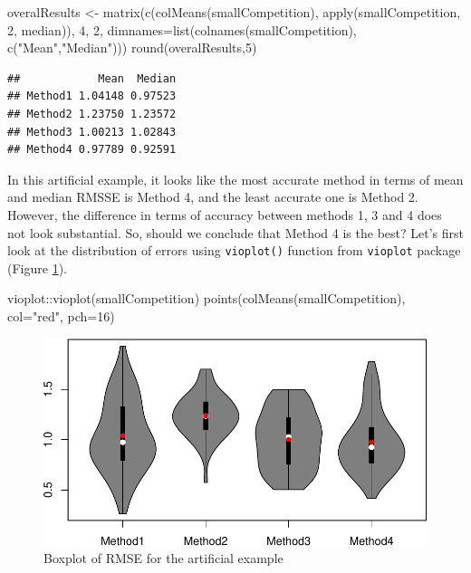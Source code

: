 \documentclass[
]{book}
\newenvironment{Shaded}{\begin{snugshade}}{\end{snugshade}}
\newcommand{\AttributeTok}[1]{\textcolor[rgb]{0.77,0.63,0.00}{#1}}
\newcommand{\DecValTok}[1]{\textcolor[rgb]{0.00,0.00,0.81}{#1}}
\newcommand{\FunctionTok}[1]{\textcolor[rgb]{0.00,0.00,0.00}{#1}}
\newcommand{\NormalTok}[1]{#1}
\newcommand{\OtherTok}[1]{\textcolor[rgb]{0.56,0.35,0.01}{#1}}
\newcommand{\SpecialCharTok}[1]{\textcolor[rgb]{0.00,0.00,0.00}{#1}}
\newcommand{\StringTok}[1]{\textcolor[rgb]{0.31,0.60,0.02}{#1}}
\theoremstyle{definition}
\theoremstyle{definition}
\theoremstyle{definition}
\theoremstyle{definition}
\theoremstyle{remark}
\begin{document}
\begin{Shaded}
\begin{Highlighting}[]
\NormalTok{overalResults }\OtherTok{\textless{}{-}}
  \FunctionTok{matrix}\NormalTok{(}\FunctionTok{c}\NormalTok{(}\FunctionTok{colMeans}\NormalTok{(smallCompetition), }
           \FunctionTok{apply}\NormalTok{(smallCompetition, }\DecValTok{2}\NormalTok{, median)),}
         \DecValTok{4}\NormalTok{, }\DecValTok{2}\NormalTok{, }\AttributeTok{dimnames=}\FunctionTok{list}\NormalTok{(}\FunctionTok{colnames}\NormalTok{(smallCompetition),}
                             \FunctionTok{c}\NormalTok{(}\StringTok{"Mean"}\NormalTok{,}\StringTok{"Median"}\NormalTok{)))}
\FunctionTok{round}\NormalTok{(overalResults,}\DecValTok{5}\NormalTok{)}
\end{Highlighting}
\end{Shaded}

\begin{verbatim}
##            Mean  Median
## Method1 1.04148 0.97523
## Method2 1.23750 1.23572
## Method3 1.00213 1.02843
## Method4 0.97789 0.92591
\end{verbatim}

In this artificial example, it looks like the most accurate method in terms of mean and median RMSSE is Method 4, and the least accurate one is Method 2. However, the difference in terms of accuracy between methods 1, 3 and 4 does not look substantial. So, should we conclude that Method 4 is the best? Let's first look at the distribution of errors using \texttt{vioplot()} function from \texttt{vioplot} package (Figure \ref{fig:smallCompetitionBoxplot}).

\begin{Shaded}
\begin{Highlighting}[]
\NormalTok{vioplot}\SpecialCharTok{::}\FunctionTok{vioplot}\NormalTok{(smallCompetition)}
\FunctionTok{points}\NormalTok{(}\FunctionTok{colMeans}\NormalTok{(smallCompetition), }\AttributeTok{col=}\StringTok{"red"}\NormalTok{, }\AttributeTok{pch=}\DecValTok{16}\NormalTok{)}
\end{Highlighting}
\end{Shaded}

\begin{figure}
\centering
\includegraphics{Svetunkov--2022----ADAM_files/figure-latex/smallCompetitionBoxplot-1.pdf}
\caption{\label{fig:smallCompetitionBoxplot}Boxplot of RMSE for the artificial example}
\end{figure}
\end{document}
